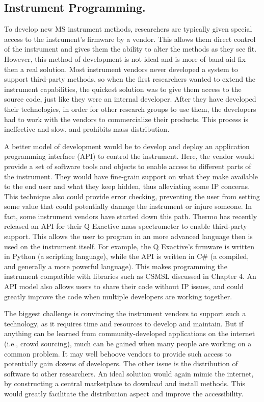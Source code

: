 \subsection*{Instrument Programming.}
To develop new MS instrument methods, researchers are typically given special access to the instrument's firmware by a vendor. This allows them direct control of the instrument and gives them the ability to alter the methods as they see fit. However, this method of development is not ideal and is more of band-aid fix then a real solution. Most instrument vendors never developed a system to support third-party methods, so when the first researchers wanted to extend the instrument capabilities, the quickest solution was to give them access to the source code, just like they were an internal developer. After they have developed their technologies, in order for other research groups to use them, the developers had to work with the vendors to commercialize their products. This process is ineffective and slow, and prohibits mass distribution. 

A better model of development would be to develop and deploy an application programming interface (API) to control the instrument. Here, the vendor would provide a set of software tools and objects to enable access to different parts of the instrument. They would have fine-grain support on what they make available to the end user and what they keep hidden, thus alleviating some IP concerns. This technique also could provide error checking, preventing the user from setting some value that could potentially damage the instrument or injure someone. In fact, some instrument vendors have started down this path. Thermo has recently released an API for their Q Exactive mass spectrometer to enable third-party support. This allows the user to program in an more advanced language then is used on the instrument itself. For example, the Q Exactive's firmware is written in Python (a scripting language), while the API is written in C\# (a compiled, and generally a more powerful language). This makes programming the instrument compatible with libraries such as CSMSL discussed in Chapter 4. An API model also allows users to share their code without IP issues, and could greatly improve the code when multiple developers are working together. 

The biggest challenge is convincing the instrument vendors to support such a technology, as it requires time and resources to develop and maintain. But if anything can be learned from community-developed applications on the internet (i.e., crowd sourcing), much can be gained when many people are working on a common problem. It may well behoove vendors to provide such access to potentially gain dozens of developers. The other issue is the distribution of software to other researchers. An ideal solution would again mimic the internet, by constructing a central marketplace to download and install methods. This would greatly facilitate the distribution aspect and improve the accessibility.

